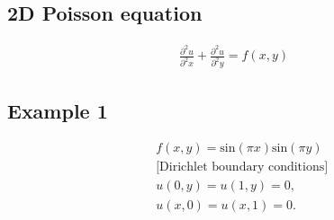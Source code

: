 \documentclass[a4paper, 11pt]{article} %
\begin{document}
\subsection*{2D Poisson equation}
\begin{center}
\begin{align}
\frac{\partial^2 u}{\partial^2 x} + \frac{\partial^2 u}{\partial^2 y} = f(x,y)
\end{align}
\end{center}

\subsection*{Example 1}
\begin{align}
&f(x,y) = \text{sin}(\pi x)\text{sin}(\pi y) \\
~~&\text{[Dirichlet boundary conditions]} \nonumber \\
&u(0,y) = u(1,y) = 0, \\
&u(x,0) = u(x,1) = 0. 
\end{align}
\end{document}

